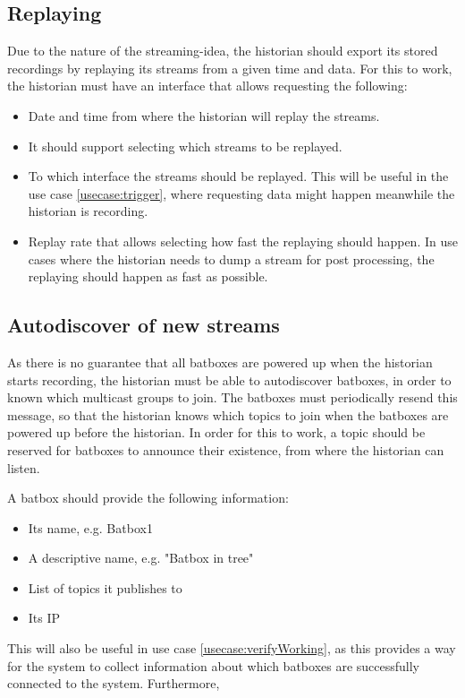 \subsection{Replaying}
Due to the nature of the streaming-idea, the historian should export its stored recordings by replaying its streams from a given time and data. For this to work, the historian must have an interface that allows requesting the following:

\begin{itemize}
	\item Date and time from where the historian will replay the streams.
	\item It should support selecting which streams to be replayed.
	\item To which interface the streams should be replayed. This will be useful in the use case \ref{usecase:trigger}, where requesting data might happen meanwhile the historian is recording.
	\item Replay rate that allows selecting how fast the replaying should happen. In use cases where the historian needs to dump a stream for post processing, the replaying should happen as fast as possible.
\end{itemize}

\subsection{Autodiscover of new streams}
As there is no guarantee that all batboxes are powered up when the historian starts recording, the historian must be able to autodiscover batboxes, in order to known which multicast groups to join. The batboxes must periodically resend this message, so that the historian knows which topics to join when the batboxes are powered up before the historian.
 In order for this to work, a topic should be reserved for batboxes to announce their existence, from where the historian can listen. 

A batbox should provide the following information:
\begin{itemize}
	\item Its name, e.g. Batbox1
	\item A descriptive name, e.g. "Batbox in tree"
	\item List of topics it publishes to
	\item Its IP
\end{itemize}
 

This will also be useful in use case \ref{usecase:verifyWorking}, as this provides a way for the system to collect information about which batboxes are successfully connected to the system.
Furthermore, 

